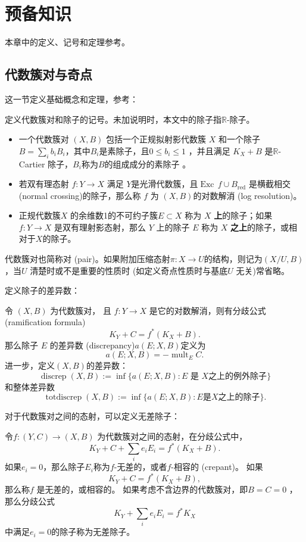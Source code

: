 \chapter{预备知识}
本章中的定义、记号和定理参考\cite{BCHM10,km,kmm}。
\section{代数簇对与奇点}
这一节定义基础概念和定理，参考\cite{BCHM10,km}：
\begin{definition}
  定义代数簇对和除子的记号。未加说明时，本文中的除子指$\mathbb{R}$-除子。
  \begin{itemize}
    \item 一个代数簇对 $(X,B)$ 包括一个正规拟射影代数簇 $X$ 和一个除子 $B=\sum_{i}b_{i}B_{i}$，其中$B_{i}$是素除子，且$0\leqslant b_{i} \leqslant 1$ ，并且满足 $ K_{X}+B $ 是$\mathbb{R}$-Cartier 除子，$B_{i}$称为$B$的组成成分的素除子 。
    \item 若双有理态射 $f:Y\to X$ 满足 $Y$是光滑代数簇，且$\operatorname{Exc}\,f \cup B_{\text{red}} $ 是横截相交 (normal crossing)的除子，那么称 $f$ 为 $(X,B)$的对数解消 (log resolution)。  
    \item 正规代数簇$X$ 的余维数1的不可约子簇$ E \subset X $ 称为 $X$ \textbf{上}的除子；如果 $f: Y \to X$ 是双有理射影态射，那么 $Y$ 上的除子 $E$ 称为 $X$ \textbf{之上}的除子，或相对于$X$的除子。  
  \end{itemize}
  代数簇对也简称对 (pair)。如果附加压缩态射$\pi:X\to U$的结构，则记为$(X/U,B)$，当$U$ 清楚时或不是重要的性质时 (如定义奇点性质时与基底$U$ 无关)常省略。 
\end{definition}

定义除子的差异数：
\begin{definition}
  令 $(X, B)$ 为代数簇对， 且 $f: Y\to X$ 是它的对数解消，则有分歧公式 (ramification formula)
  \[ K_{Y}+C=f^*(K_{X}+B) .\]
  那么除子 $E$ 的差异数 (discrepancy)$a(E;X,B) $定义为
  \[ a(E;X,B)=-\operatorname{mult}_{E}C .\]
  进一步，定义$(X,B) $的差异数：
  \[ \operatorname{discrep}(X, B) := \inf\{a(E; X, B) : E \text{ 是 } X \text{之上的例外除子} \} \]
  和整体差异数
  \[ \operatorname{totdiscrep}(X, B) :=\inf \{a(E; X, B) : E \text{是} X \text{之上的除子}\}. \]
\end{definition}
对于代数簇对之间的态射，可以定义无差除子：
\begin{definition}
 令$f:(Y,C)\to (X,B)$ 为代数簇对之间的态射，在分歧公式中，
 \[ K_{Y}+C + \sum_{i}e_{i}E_{i}=f^{*}(K_{X}+B) .\]
 如果$e_{i}=0$，那么除子$E_{i}$称为$f$-无差的，或者$f$-相容的 (crepant)。 如果
 \[ K_{Y}+C=f^{*}(K_{X}+B) ,\]
那么称$f$ 是无差的，或相容的。
如果考虑不含边界的代数簇对，即$B=C=0$ ，那么分歧公式
 \[ K_{Y} + \sum_{i}e_{i}E_{i}=f^{*}K_{X} \]
 中满足$e_{i}=0$的除子称为无差除子。
\end{definition}

